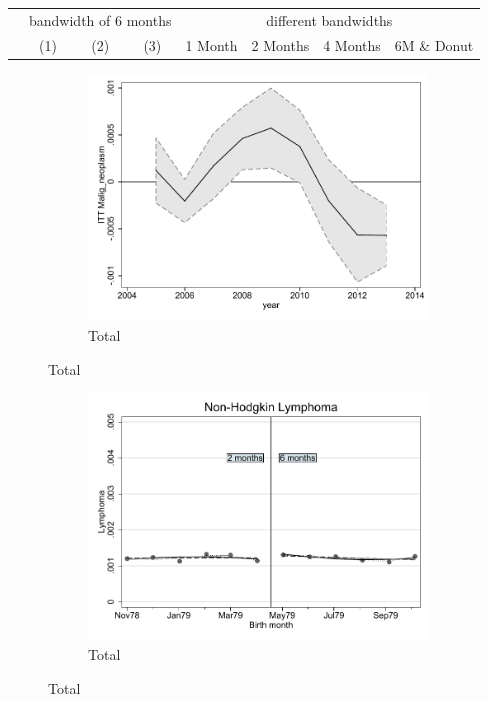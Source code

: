 \documentclass[a4paper ]{article}
\begin{document}
\begin{table}[h]\centering
\def\sym#1{\ifmmode^{#1}\else\(^{#1}\)\fi}
\begin{tabular}{l*{3}{c}|cccc}
\toprule
&\multicolumn{3}{c}{bandwidth of 6 months} & \multicolumn{4}{c}{different bandwidths} \\
 \cmidrule(lr{1em}){2-4} \cmidrule(lr{1em}){5-8}
 &\multicolumn{1}{c}{(1)}&\multicolumn{1}{c}{(2)}&\multicolumn{1}{c}{(3)}& 1 Month & 2 Months & 4 Months & 6M \& Donut \\
\midrule 

\bottomrule
\end{tabular}
\end{table}

\begin{figure}[h!]
	\centering
	\begin{subfigure}[t]{0.5\textwidth}
		\centering
		\includegraphics[width=0.99\textwidth]{R1_LC_Malig_neoplasm}
		\caption{Total}		
	\end{subfigure}
\end{figure}
\newpage
\begin{figure}[h]
	\centering
	\begin{subfigure}[t]{0.5\textwidth}
		\centering
		\includegraphics[width=0.99\textwidth]{R1_RD_Lymphoma_fits}
		\caption{Total}		
	\end{subfigure}
\end{figure}
\end{document}

